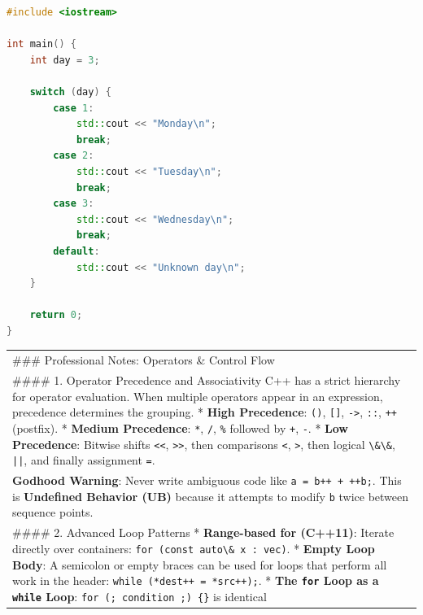 \begin{lstlisting}[language={C++}]
#include <iostream>

int main() {
    int day = 3;
    
    switch (day) {
        case 1:
            std::cout << "Monday\n";
            break;
        case 2:
            std::cout << "Tuesday\n";
            break;
        case 3:
            std::cout << "Wednesday\n";
            break;
        default:
            std::cout << "Unknown day\n";
    }
    
    return 0;
}
\end{lstlisting}

\begin{longtable}[]{@{}
  >{\raggedright\arraybackslash}p{}@{}}
\toprule
\endhead
\#\#\# Professional Notes: Operators \& Control Flow \\
\#\#\#\# 1. Operator Precedence and Associativity C++ has a strict
hierarchy for operator evaluation. When multiple operators appear in an
expression, precedence determines the grouping. * \textbf{High
Precedence}: \passthrough{\lstinline!()!}, \passthrough{\lstinline![]!},
\passthrough{\lstinline!->!}, \passthrough{\lstinline!::!},
\passthrough{\lstinline!++!} (postfix). * \textbf{Medium Precedence}:
\passthrough{\lstinline!*!}, \passthrough{\lstinline!/!},
\passthrough{\lstinline!\%!} followed by \passthrough{\lstinline!+!},
\passthrough{\lstinline!-!}. * \textbf{Low Precedence}: Bitwise shifts
\passthrough{\lstinline!<<!}, \passthrough{\lstinline!>>!}, then
comparisons \passthrough{\lstinline!<!}, \passthrough{\lstinline!>!},
then logical \passthrough{\lstinline!\&\&!},
\passthrough{\lstinline!||!}, and finally assignment
\passthrough{\lstinline!=!}. \\
\textbf{Godhood Warning}: Never write ambiguous code like
\passthrough{\lstinline!a = b++ + ++b;!}. This is \textbf{Undefined
Behavior (UB)} because it attempts to modify \passthrough{\lstinline!b!}
twice between sequence points. \\
\#\#\#\# 2. Advanced Loop Patterns * \textbf{Range-based for (C++11)}:
Iterate directly over containers:
\passthrough{\lstinline!for (const auto\& x : vec)!}. * \textbf{Empty
Loop Body}: A semicolon or empty braces can be used for loops that
perform all work in the header:
\passthrough{\lstinline!while (*dest++ = *src++);!}. * \textbf{The
\passthrough{\lstinline!for!} Loop as a \passthrough{\lstinline!while!}
Loop}: \passthrough{\lstinline!for (; condition ;) \{\}!} is identical

\end{longtable}
